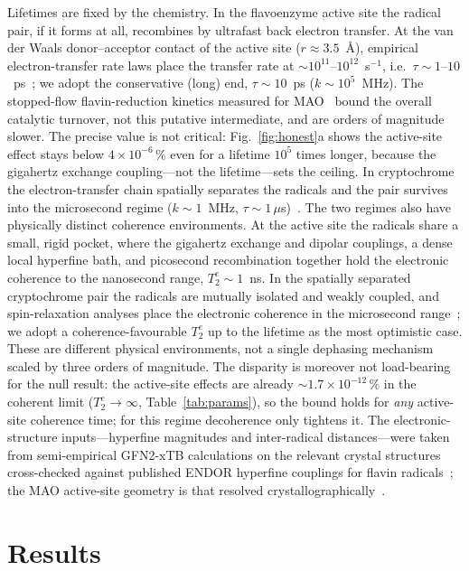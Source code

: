 \documentclass[twoside,twocolumn,9pt]{article}
\begin{document}
Lifetimes are fixed by the chemistry. In the flavoenzyme active site the radical
pair, if it forms at all, recombines by ultrafast back electron transfer. At the
van der Waals donor--acceptor contact of the active site ($r\approx3.5$~\AA),
empirical electron-transfer rate laws place the transfer rate at
$\sim10^{11}$--$10^{12}$~s$^{-1}$, i.e.\ $\tau\sim1$--$10$~ps~\cite{Moser1992}; we
adopt the conservative (long) end, $\tau\sim10$~ps ($k\sim10^{5}$~MHz). The
stopped-flow flavin-reduction kinetics measured for
MAO~\cite{Ramsay1991,Vianello2012,Edmondson2004main} bound the overall catalytic
turnover, not this putative intermediate, and are orders of magnitude slower. The
precise value is not critical: Fig.~\ref{fig:honest}a shows the active-site effect
stays below $4\times10^{-6}\,\%$ even for a lifetime $10^{5}$ times longer, because
the gigahertz exchange coupling---not the lifetime---sets the ceiling. In
cryptochrome the
electron-transfer chain spatially separates the radicals and the pair survives
into the microsecond regime ($k\sim1$~MHz,
$\tau\sim1\,\mu$s)~\cite{Maeda2012,Hiscock2016}. The two regimes also have
physically distinct coherence environments. At the active site the radicals
share a small, rigid pocket, where the gigahertz exchange and dipolar couplings,
a dense local hyperfine bath, and picosecond recombination together hold the
electronic coherence to the nanosecond range, $T_2^e\sim1$~ns. In the spatially
separated cryptochrome pair the radicals are mutually isolated and weakly
coupled, and spin-relaxation analyses place the electronic coherence in the
microsecond range~\cite{Kattnig2016}; we adopt a coherence-favourable $T_2^e$ up
to the lifetime as the most optimistic case. These are different physical
environments, not a single dephasing mechanism scaled by three orders of
magnitude. The disparity is moreover not load-bearing for the null result: the
active-site effects are already $\sim\!1.7\times10^{-12}\,\%$ in the coherent limit
($T_2^e\to\infty$, Table~\ref{tab:params}), so the bound holds for \emph{any}
active-site coherence time; for this regime decoherence only tightens it. The electronic-structure inputs---hyperfine
magnitudes and inter-radical distances---were taken from semi-empirical GFN2-xTB
calculations on the relevant crystal structures~\cite{Bannwarth2019}
cross-checked against published ENDOR hyperfine couplings for flavin
radicals~\cite{Weber1998}; the MAO active-site geometry is that resolved
crystallographically~\cite{Edmondson2004main}.

\section{Results}
\end{document}
